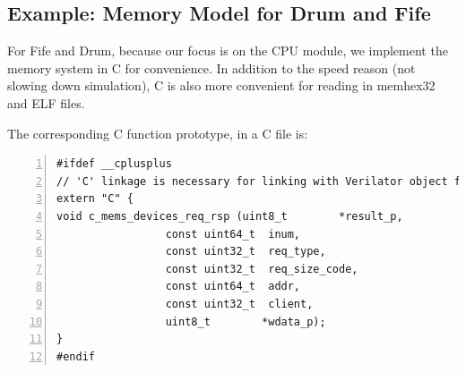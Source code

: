 \subsection{Example: Memory Model for Drum and Fife}

For Fife and Drum, because our focus is on the CPU module, we
implement the memory system in C for convenience.  In addition to the
speed reason (not slowing down simulation), C is also more convenient
for reading in memhex32 and ELF files.



The corresponding C function prototype, in a C file is:

{\small
\begin{Verbatim}[frame=single, numbers=left]
#ifdef __cplusplus
// 'C' linkage is necessary for linking with Verilator object files
extern "C" {
void c_mems_devices_req_rsp (uint8_t        *result_p,
			     const uint64_t  inum,
			     const uint32_t  req_type,
			     const uint32_t  req_size_code,
			     const uint64_t  addr,
			     const uint32_t  client,
			     uint8_t        *wdata_p);
}
#endif
\end{Verbatim}
}

